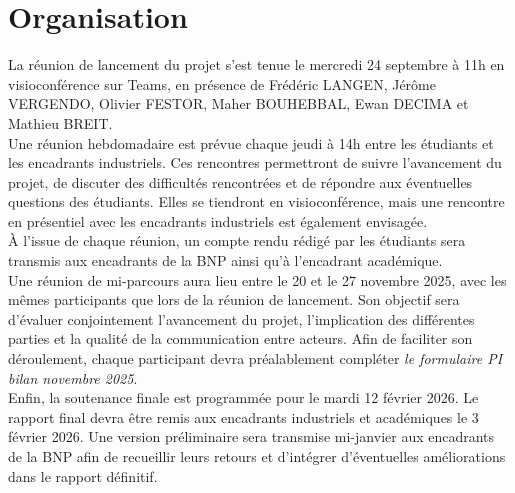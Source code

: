 \section{Organisation}

La réunion de lancement du projet s’est tenue le mercredi 24 septembre à 11h en visioconférence sur Teams, en présence de Frédéric LANGEN, Jérôme VERGENDO, Olivier FESTOR, Maher BOUHEBBAL, Ewan DECIMA et Mathieu BREIT. \\

Une réunion hebdomadaire est prévue chaque jeudi à 14h entre les étudiants et les encadrants industriels. Ces rencontres permettront de suivre l’avancement du projet, de discuter des difficultés rencontrées et de répondre aux éventuelles questions des étudiants. Elles se tiendront en visioconférence, mais une rencontre en présentiel avec les encadrants industriels est également envisagée. \\

À l’issue de chaque réunion, un compte rendu rédigé par les étudiants sera transmis aux encadrants de la BNP ainsi qu’à l’encadrant académique. \\

Une réunion de mi-parcours aura lieu entre le 20 et le 27 novembre 2025, avec les mêmes participants que lors de la réunion de lancement. Son objectif sera d’évaluer conjointement l’avancement du projet, l’implication des différentes parties et la qualité de la communication entre acteurs. Afin de faciliter son déroulement, chaque participant devra préalablement compléter \textit{le formulaire PI bilan novembre 2025}. \\

Enfin, la soutenance finale est programmée pour le mardi 12 février 2026. Le rapport final devra être remis aux encadrants industriels et académiques le 3 février 2026. Une version préliminaire sera transmise mi-janvier aux encadrants de la BNP afin de recueillir leurs retours et d’intégrer d’éventuelles améliorations dans le rapport définitif.